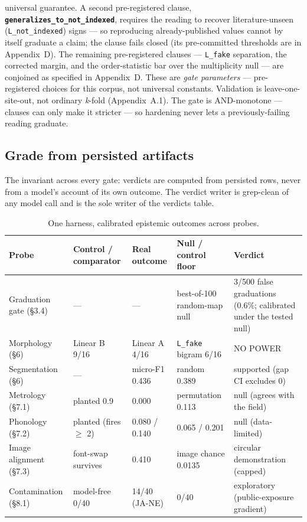 universal guarantee. A second
pre-registered clause, \textbf{\texttt{generalizes\_to\_not\_indexed}},
requires the reading to recover literature-unseen (\texttt{L\_not\_indexed})
signs --- so reproducing already-published values cannot by itself
graduate a claim; the clause fails closed (its pre-committed thresholds
are in Appendix~D). The remaining pre-registered clauses ---
\texttt{L\_fake} separation, the corrected margin, and the
order-statistic bar over the multiplicity null --- are conjoined as
specified in Appendix~D. These are
\emph{gate parameters} --- pre-registered
choices for this corpus, not universal constants. Validation is
leave-one-site-out, not ordinary \emph{k}-fold (Appendix~A.1). The gate is
AND-monotone --- clauses can only make it stricter --- so hardening never
lets a previously-failing reading graduate.

\subsection{Grade from persisted artifacts}

The invariant across every gate: verdicts are computed from persisted
rows, never from a model's account of its own outcome. The verdict writer
is grep-clean of any model call and is the sole writer of the verdicts
table.

\begin{table}[t]
\centering
\begin{tabular}{@{}p{2.6cm}p{3.0cm}p{2.4cm}p{3.0cm}p{3.3cm}@{}}
\toprule
\textbf{Probe} & \textbf{Control / comparator} & \textbf{Real outcome} &
\textbf{Null / control floor} & \textbf{Verdict} \\
\midrule
Graduation gate (\S3.4) & --- & --- & best-of-100 random-map null &
3/500 false graduations (0.6\%; calibrated under the tested null) \\
Morphology (\S6) & Linear B 9/16 & Linear A 4/16 & \texttt{L\_fake}
bigram 6/16 & NO POWER \\
Segmentation (\S6) & --- & micro-F1 0.436 & random 0.389 & supported (gap
CI excludes 0) \\
Metrology (\S7.1) & planted 0.9 & 0.000 & permutation 0.113 & null
(agrees with the field) \\
Phonology (\S7.2) & planted (fires $\ge$ 2) & 0.080 / 0.140 & 0.065 /
0.201 & null (data-limited) \\
Image alignment (\S7.3) & font-swap survives & 0.410 & image chance
0.0135 & circular demonstration (capped) \\
Contamination (\S8.1) & model-free 0/40 & 14/40 (JA-NE) & 0/40 &
exploratory (public-exposure gradient) \\
\bottomrule
\end{tabular}
\caption{One harness, calibrated epistemic outcomes across probes.}
\label{tab:harness}
\end{table}

